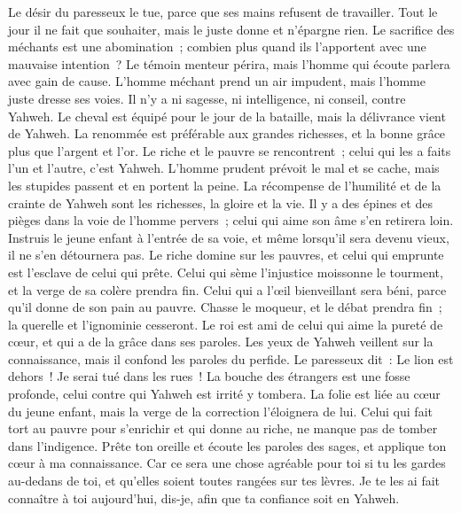 \begin{multicols}{2}
Le désir du paresseux le tue, parce que ses mains refusent de travailler.
Tout le jour il ne fait que souhaiter, mais le juste donne et n'épargne rien.
Le sacrifice des méchants est une abomination~; combien plus quand ils l'apportent avec une mauvaise intention~?
Le témoin menteur périra, mais l'homme qui écoute parlera avec gain de cause.
L'homme méchant prend un air impudent, mais l'homme juste dresse ses voies.
Il n'y a ni sagesse, ni intelligence, ni conseil, contre Yahweh.
Le cheval est équipé pour le jour de la bataille, mais la délivrance vient de Yahweh.
\VerseOne{}La renommée est préférable aux grandes richesses, et la bonne grâce plus que l'argent et l'or.
Le riche et le pauvre se rencontrent~; celui qui les a faits l'un et l'autre, c'est Yahweh.
L'homme prudent prévoit le mal et se cache, mais les stupides passent et en portent la peine.
La récompense de l'humilité et de la crainte de Yahweh sont les richesses, la gloire et la vie.
Il y a des épines et des pièges dans la voie de l'homme pervers~; celui qui aime son âme s'en retirera loin.
Instruis le jeune enfant à l'entrée de sa voie, et même lorsqu'il sera devenu vieux, il ne s'en détournera pas.
Le riche domine sur les pauvres, et celui qui emprunte est l'esclave de celui qui prête.
Celui qui sème l'injustice moissonne le tourment, et la verge de sa colère prendra fin.
Celui qui a l'œil bienveillant sera béni, parce qu'il donne de son pain au pauvre.
Chasse le moqueur, et le débat prendra fin~; la querelle et l'ignominie cesseront.
Le roi est ami de celui qui aime la pureté de cœur, et qui a de la grâce dans ses paroles.
Les yeux de Yahweh veillent sur la connaissance, mais il confond les paroles du perfide.
Le paresseux dit~: Le lion est dehors~! Je serai tué dans les rues~!
La bouche des étrangers est une fosse profonde, celui contre qui Yahweh est irrité y tombera.
La folie est liée au cœur du jeune enfant, mais la verge de la correction l'éloignera de lui.
Celui qui fait tort au pauvre pour s'enrichir et qui donne au riche, ne manque pas de tomber dans l'indigence.
Prête ton oreille et écoute les paroles des sages, et applique ton cœur à ma connaissance.
Car ce sera une chose agréable pour toi si tu les gardes au-dedans de toi, et qu'elles soient toutes rangées sur tes lèvres.
Je te les ai fait connaître à toi aujourd'hui, dis-je, afin que ta confiance soit en Yahweh.

\end{multicols}
